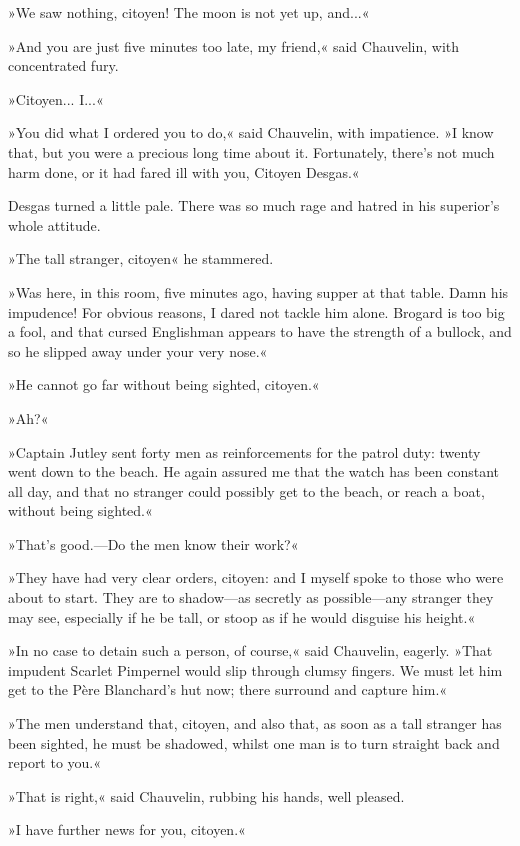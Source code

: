 »We saw nothing, citoyen! The moon is not yet up, and...«

»And you are just five minutes too late, my friend,« said Chauvelin, with concentrated fury.

»Citoyen... I...«

»You did what I ordered you to do,« said Chauvelin, with impatience. »I know that, but you were a precious long time about it. Fortunately, there's not much harm done, or it had fared ill with you, Citoyen Desgas.«

Desgas turned a little pale. There was so much rage and hatred in his superior's whole attitude.

»The tall stranger, citoyen\longdash« he stammered.

»Was here, in this room, five minutes ago, having supper at that table. Damn his impudence! For obvious reasons, I dared not tackle him alone. Brogard is too big a fool, and that cursed Englishman appears to have the strength of a bullock, and so he slipped away under your very nose.«

»He cannot go far without being sighted, citoyen.«

»Ah?«

»Captain Jutley sent forty men as reinforcements for the patrol duty: twenty went down to the beach. He again assured me that the watch has been constant all day, and that no stranger could possibly get to the beach, or reach a boat, without being sighted.«

»That's good.\allowbreak---\allowbreak Do the men know their work?«

»They have had very clear orders, citoyen: and I myself spoke to those who were about to start. They are to shadow\allowbreak---\allowbreak as secretly as possible\allowbreak---\allowbreak any stranger they may see, especially if he be tall, or stoop as if he would disguise his height.«

»In no case to detain such a person, of course,« said Chauvelin, eagerly. »That impudent Scarlet Pimpernel would slip through clumsy fingers. We must let him get to the Père Blanchard's hut now; there surround and capture him.«

»The men understand that, citoyen, and also that, as soon as a tall stranger has been sighted, he must be shadowed, whilst one man is to turn straight back and report to you.«

»That is right,« said Chauvelin, rubbing his hands, well pleased.

»I have further news for you, citoyen.«

